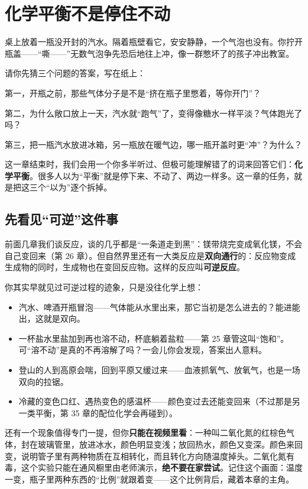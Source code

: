 \chapter{化学平衡不是停住不动}

\begin{kaichang}
桌上放着一瓶没开封的汽水。隔着瓶壁看它，安安静静，一个气泡也没有。你拧开瓶盖——“嘶——”无数气泡争先恐后地往上冲，像一群憋坏了的孩子冲出教室。

请你先猜三个问题的答案，写在纸上：

第一，开瓶之前，那些气体分子是不是“挤在瓶子里憋着，等你开门”？

第二，为什么敞口放上一天，汽水就“跑气”了，变得像糖水一样平淡？气体跑光了吗？

第三，把一瓶汽水放进冰箱，另一瓶放在暖气边，哪一瓶开盖时更“冲”？为什么？

这一章结束时，我们会用一个你多半听过、但极可能理解错了的词来回答它们：\textbf{化学平衡}。很多人以为“平衡”就是停下来、不动了、两边一样多。这一章的任务，就是把这三个“以为”逐个拆掉。
\end{kaichang}

\section{先看见“可逆”这件事}

前面几章我们谈反应，谈的几乎都是“一条道走到黑”：镁带烧完变成氧化镁，不会自己变回来（第 26 章）。但自然界里还有一大类反应是\textbf{双向通行}的：反应物变成生成物的同时，生成物也在变回反应物。这样的反应叫\textbf{可逆反应}。

你其实早就见过可逆过程的迹象，只是没往化学上想：

\begin{itemize}[itemsep=2pt]
\item 汽水、啤酒开瓶冒泡——气体能从水里出来，那它当初是怎么进去的？能进能出，这就是双向。
\item 一杯盐水里盐加到再也溶不动，杯底躺着盐粒——第 25 章管这叫“饱和”。可“溶不动”是真的不再溶解了吗？一会儿你会发现，答案出人意料。
\item 登山的人到高原会喘，回到平原又缓过来——血液抓氧气、放氧气，也是一场双向的拉锯。
\item 冷藏的变色口红、遇热变色的感温杯——颜色变过去还能变回来（不过那是另一类平衡，第 35 章的配位化学会再碰到）。
\end{itemize}

还有一个现象值得专门一提，但你\textbf{只能在视频里看}：一种叫二氧化氮的红棕色气体，封在玻璃管里，放进冰水，颜色明显变浅；放回热水，颜色又变深。颜色来回变，说明管子里有两种物质在互相转化，而且转化方向随温度掉头。二氧化氮有毒，这个实验只能在通风橱里由老师演示，\textbf{绝不要在家尝试}。记住这个画面：温度一变，瓶子里两种东西的“比例”就跟着变——这个比例背后，藏着本章的主角。

